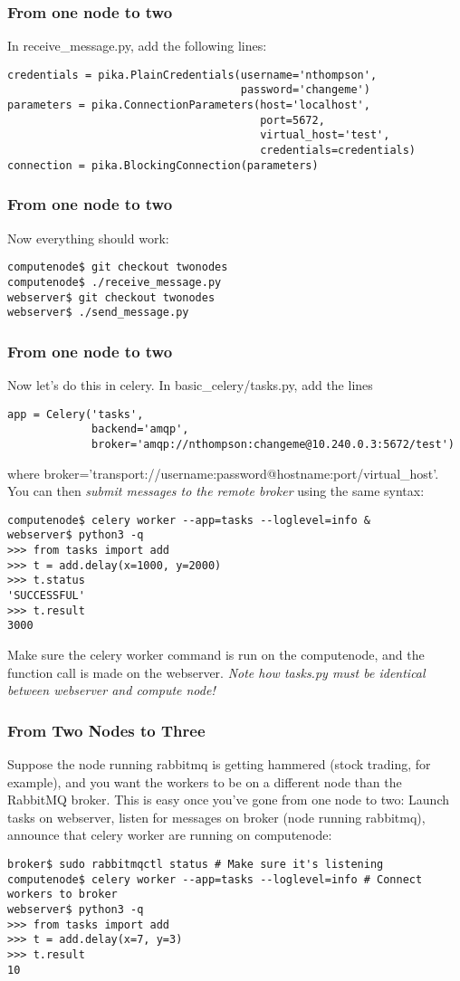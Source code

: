 \documentclass[9pt]{beamer}
\begin{document}
\begin{frame}[fragile]
  \frametitle{From one node to two}
  In receive\_message.py, add the following lines:
\begin{verbatim}
credentials = pika.PlainCredentials(username='nthompson',
                                    password='changeme')
parameters = pika.ConnectionParameters(host='localhost',
                                       port=5672,
                                       virtual_host='test',
                                       credentials=credentials)
connection = pika.BlockingConnection(parameters)
\end{verbatim}
\end{frame}

\begin{frame}[fragile]
\frametitle{From one node to two}
Now everything should work:
\begin{verbatim}
computenode$ git checkout twonodes
computenode$ ./receive_message.py
webserver$ git checkout twonodes
webserver$ ./send_message.py 
\end{verbatim}
\end{frame}

\begin{frame}[fragile]
\frametitle{From one node to two}
Now let's do this in celery. In basic\_celery/tasks.py, add the lines
\begin{verbatim}
app = Celery('tasks',
             backend='amqp',
             broker='amqp://nthompson:changeme@10.240.0.3:5672/test')
\end{verbatim}
where broker='transport://username:password@hostname:port/virtual\_host'. You can then \emph{submit messages to the remote broker} using the same syntax:
\begin{verbatim}
computenode$ celery worker --app=tasks --loglevel=info &
webserver$ python3 -q
>>> from tasks import add
>>> t = add.delay(x=1000, y=2000)
>>> t.status
'SUCCESSFUL'
>>> t.result
3000
\end{verbatim}
Make sure the celery worker command is run on the computenode, and the function call is made on the webserver. \emph{Note how tasks.py must be identical between webserver and compute node!}
\end{frame}

\begin{frame}[fragile]
  \frametitle{From Two Nodes to Three}
  Suppose the node running rabbitmq is getting hammered (stock trading, for example), and you want the workers to be on a different node than the RabbitMQ broker. This is easy once you've gone from one node to two: Launch tasks on webserver, listen for messages on broker (node running rabbitmq), announce that celery worker are running on computenode:
  \begin{verbatim}
broker$ sudo rabbitmqctl status # Make sure it's listening
computenode$ celery worker --app=tasks --loglevel=info # Connect workers to broker
webserver$ python3 -q
>>> from tasks import add
>>> t = add.delay(x=7, y=3)
>>> t.result
10
  \end{verbatim}
\end{frame}
\end{document}
